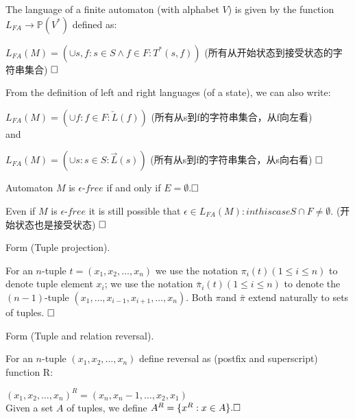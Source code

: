 \begin{definition}[Language of an $FA$]
	The language of a finite automaton (with alphabet $V$) is given by the function $L_{FA}\to \mathbb{P}(V^\ast)$ defined as:
	
	$L_{FA}(M)=(\cup s,f:s\in S\land f\in F:T^\ast(s,f))$ (所有从开始状态到接受状态的字符串集合)
	$\hfill\square$
\end{definition}

\begin{property}[Language of an $FA$]
	From the definition of left and right languages (of a state), we can also write:
	
	$L_{FA}(M) = (\cup f:f\in F:\overleftarrow{L}(f))$ (所有从s到f的字符串集合，从f向左看)\\
	and
	
	$L_{FA}(M) = (\cup s:s\in S:\overrightarrow{L}(s))$ (所有从s到f的字符串集合，从s向右看)
	$\hfill\square$
\end{property}

\begin{definition}
	Automaton $M$ is $\epsilon$-$free$ if and only if $E=\emptyset$.$\hfill\square$
\end{definition}

\begin{remark}
	Even if $M$ is $\epsilon$-$free$ it is still possible that $\epsilon\in L_{FA}(M): in this case S\cap F \ne \emptyset$. (开始状态也是接受状态) $\hfill\square$
\end{remark}


Form \cite[Convention A.4]{WATSON93a} (Tuple projection).

\begin{convention}\label{con:project}
	For an $n$-tuple $t=(x_1,x_2,\dots,x_n)$ we use the notation
	$\pi_i(t) (1\le i\le n)$ to denote tuple element $x_i$; we use the notation $\bar{\pi}_i(t) (1\le i\le n)$ to denote the $(n-1)$-tuple $(x_1,\dots,x_{i-1},x_{i+1},\dots,x_n)$. Both $\pi$and $\bar{\pi}$ extend naturally to sets of tuples. $\hfill\square$
\end{convention}

Form \cite[Definition A.20]{WATSON93a} (Tuple and relation reversal).

\begin{definition} \label{def:reversal}
	For an $n$-tuple $(x_1,x_2,\dots,x_n)$ define reversal as (postfix and superscript) function R:
	
	$(x_1,x_2,\dots,x_n)^R = (x_n,x_n-1,\dots,x_2,x_1)$ \\
	Given a set $A$ of tuples, we define $A^R=\{x^R:x\in A\}. \hfill\square$
\end{definition}

